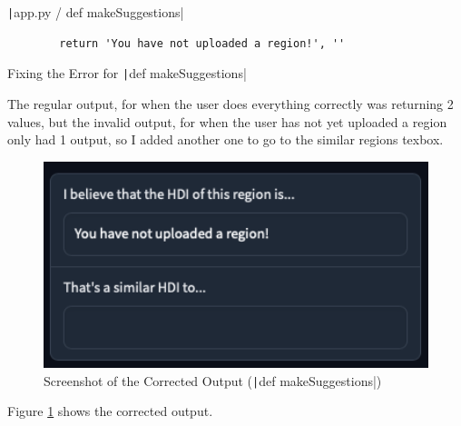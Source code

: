 \documentclass[12pt]{report}
\newcommand{\pil}[1]{\protect\texttt|#1|}
\begin{document}
\begin{listing}[H]
\pil{app.py / def makeSuggestions}
\begin{verbatim}
        return 'You have not uploaded a region!', ''
\end{verbatim}
\caption{Fixing the Error for \pil{def makeSuggestions}}\label{cs:fixForMakeSuggestions}
\end{listing}

The regular output, for when the user does everything correctly was returning 2 values, but the invalid output, for when the user has not yet uploaded a region only had 1 output, so I added another one to go to the similar regions texbox.

\begin{figure}[H]
\centering
\includegraphics[width=13cm]{ss22.2.png}
\caption{Screenshot of the Corrected Output (\pil{def makeSuggestions})}\label{fig:ss22.2}
\end{figure}

Figure \ref{fig:ss22.2} shows the corrected output.

\begin{center}
\end{center}
\end{document}
